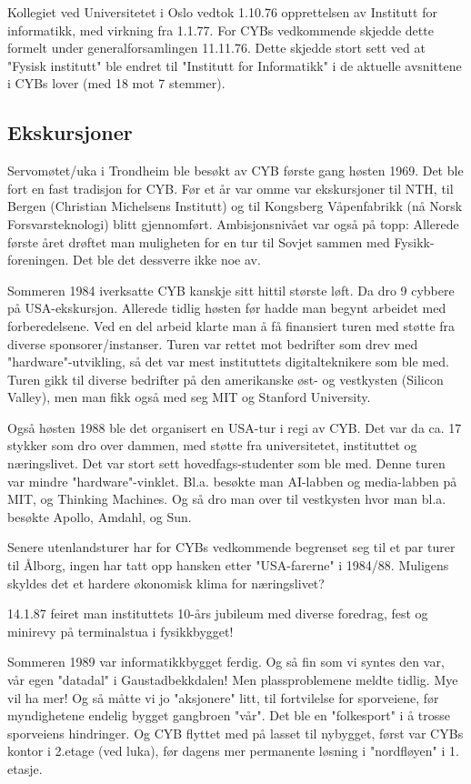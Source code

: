 \documentclass[../main.tex]{subfiles}
\begin{document}
Kollegiet ved Universitetet i Oslo vedtok 1.10.76 opprettelsen av Institutt for informatikk, med virkning fra 1.1.77. For CYBs vedkommende skjedde dette formelt under generalforsamlingen 11.11.76. Dette skjedde stort sett ved at "Fysisk institutt" ble endret til "Institutt for Informatikk" i de aktuelle avsnittene i CYBs lover (med 18 mot 7 stemmer).

\subsection{Ekskursjoner}
Servomøtet/uka i Trondheim ble besøkt av CYB første gang høsten 1969. Det ble fort en fast tradisjon for CYB. Før et år var omme var ekskursjoner til NTH, til Bergen (Christian Michelsens Institutt) og til Kongsberg Våpenfabrikk (nå Norsk Forsvarsteknologi) blitt gjennomført. Ambisjonsnivået var også på topp: Allerede første året drøftet man muligheten for en tur til Sovjet sammen med Fysikk-foreningen. Det ble det dessverre ikke noe av.

Sommeren 1984 iverksatte CYB kanskje sitt hittil største løft. Da dro 9 cybbere på USA-ekskursjon. Allerede tidlig høsten før hadde man begynt arbeidet med forberedelsene. Ved en del arbeid klarte man å få finansiert turen med støtte fra diverse sponsorer/instanser. Turen var rettet mot bedrifter som drev med "hardware"-utvikling, så det var mest instituttets digitalteknikere som ble med. Turen gikk til diverse bedrifter på den amerikanske øst- og vestkysten (Silicon Valley), men man fikk også med seg MIT og Stanford University.

Også høsten 1988 ble det organisert en USA-tur i regi av CYB. Det var da ca. 17 stykker som dro over dammen, med støtte fra universitetet, instituttet og næringslivet. Det var stort sett hovedfags-studenter som ble med. Denne turen var mindre "hardware"-vinklet. Bl.a. besøkte man AI-labben og media-labben på MIT, og Thinking Machines. Og så dro man over til vestkysten hvor man bl.a. besøkte Apollo, Amdahl, og Sun.

Senere utenlandsturer har for CYBs vedkommende begrenset seg til et par turer til Ålborg, ingen har tatt opp hansken etter "USA-farerne" i 1984/88. Muligens skyldes det et hardere økonomisk klima for næringslivet?

14.1.87 feiret man instituttets 10-års jubileum med diverse foredrag, fest og minirevy på terminalstua i fysikkbygget!

Sommeren 1989 var informatikkbygget ferdig. Og så fin som vi syntes den var, vår egen "datadal" i Gaustadbekkdalen! Men plassproblemene meldte tidlig. Mye vil ha mer! Og så måtte vi jo "aksjonere" litt, til fortvilelse for sporveiene, før myndighetene endelig bygget gangbroen "vår". Det ble en "folkesport" i å trosse sporveiens hindringer. Og CYB flyttet med på lasset til nybygget, først var CYBs kontor i 2.etage (ved luka), før dagens mer permanente løsning i "nordfløyen" i 1. etasje.
\end{document}

